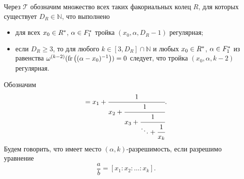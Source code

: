 \documentclass[_00_dissertation.tex]{subfiles}
\begin{document}
\begin{definition}
    Через $\mathcal{T}$ обозначим множество всех таких факориальных колец $R$, для которых существует $D_R \in \mathbb{N}$, что выполнено
    \begin{itemize}
        \item для всех $x_0 \in R^{*}$, $\alpha \in F_1^{*}$ тройка $(x_0, \alpha, D_R - 1)$ регулярная;

        \item если $D_R \ge 3$, то для любого $k \in [3, D_R] \cap \mathbb{N}$ и любых $x_0 \in R^{*}$, $\alpha \in F_1^{*}$ из равенства $\omega^{(k-2)}(\textrm{fr}\left((\alpha - x_0)^{-1}\right)) = 0$ следует, что тройка $(x_0, \alpha, k-2)$ регулярная.
    \end{itemize}
\end{definition}

\begin{definition}
    Обозначим
    \begin{equation*}
        [x_1: x_2: \dots: x_k] = x_{1} + \cfrac{1}{
            x_{2} + \cfrac{1}{
                x_{3} + \cfrac{1}{
                    \ddots + \cfrac{1}{
                        x_{k}
                    }
                }
            }
        }.
    \end{equation*}
    Будем говорить, что имеет место $(\alpha, k)$-разрешимость, если разрешимо уравнение
    \begin{equation*}
        \frac{a}{b} = [x_1: x_2: \dots: x_k].
    \end{equation*}
\end{definition}
\end{document}
